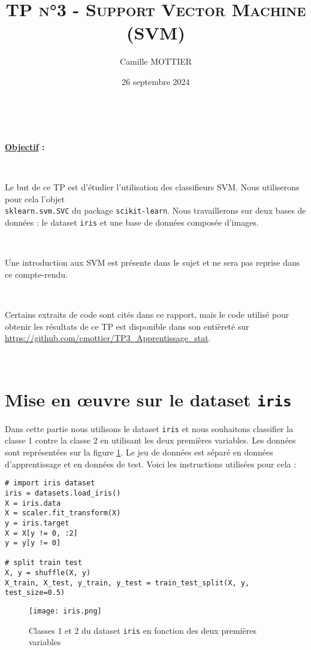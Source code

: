 \documentclass[11pt,a4paper]{article}
\title{\textsc{TP n°3 - Support Vector Machine (SVM)}}
\author{Camille MOTTIER}
\date{26 septembre 2024}
\theoremstyle{definition}
\begin{document}
\maketitle

\



\textbf{\underline{Objectif} : }

\

Le but de ce TP est d'étudier l'utilisation des classifieurs SVM. Nous utiliserons pour cela l'objet \\
\texttt{sklearn.svm.SVC} du package \texttt{scikit-learn}. Nous travaillerons sur deux bases de données : le dataset \texttt{iris} et une base de données composée d'images.

\

Une introduction aux SVM est présente dans le sujet et ne sera pas reprise dans ce compte-rendu. 

\

Certains extraits de code sont cités dans ce rapport, mais le code utilisé pour obtenir les résultats de ce TP est disponible dans son entièreté sur \url{https://github.com/cmottier/TP3_Apprentissage_stat}.

\

\section{Mise en œuvre sur le dataset \texttt{iris}}

Dans cette partie nous utilisons le dataset \texttt{iris} et nous souhaitons classifier la classe 1 contre la classe 2 en utilisant les deux premières variables. Les données sont représentées sur la figure \ref{iris}. Le jeu de données est séparé en données d'apprentissage et en données de test. Voici les instructions utilisées pour cela :

\begin{verbatim}
# import iris dataset
iris = datasets.load_iris()
X = iris.data
X = scaler.fit_transform(X)
y = iris.target
X = X[y != 0, :2]
y = y[y != 0]

# split train test
X, y = shuffle(X, y)
X_train, X_test, y_train, y_test = train_test_split(X, y, test_size=0.5)
\end{verbatim}

\begin{figure}[h!]\centering
\texttt{[image: iris.png]}
\caption{Classes 1 et 2 du dataset \texttt{iris} en fonction des deux premières variables}
\label{iris}
\end{figure}
\end{document}
